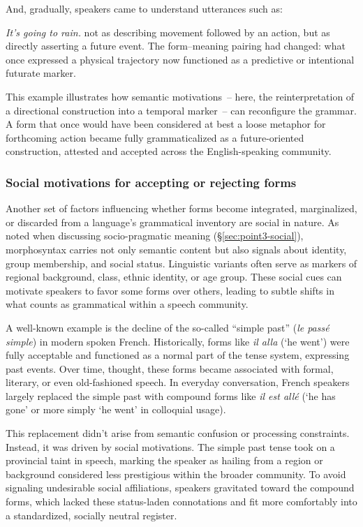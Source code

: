 \ea
    \z
\z
And, gradually, speakers came to understand utterances such as:

\ea
\textit{It's going to rain.}
\z
not as describing movement followed by an action, but as directly asserting a future event. The form--meaning pairing had changed: what once expressed a physical trajectory now functioned as a predictive or intentional futurate marker.

This example illustrates how semantic motivations~-- here, the reinterpretation of a directional construction into a temporal marker~-- can reconfigure the grammar. A form that once would have been considered at best a loose metaphor for forthcoming action became fully grammaticalized as a future-oriented construction, attested and accepted across the English-speaking community.

\subsubsection{Social motivations for accepting or rejecting forms}\label{subsec:social-motivations}

Another set of factors influencing whether forms become integrated, marginalized, or discarded from a language’s grammatical inventory are social in nature. As noted when discussing socio-pragmatic meaning (\S\ref{sec:point3-social}), morphosyntax carries not only semantic content but also signals about identity, group membership, and social status. Linguistic variants often serve as markers of regional background, class, ethnic identity, or age group. These social cues can motivate speakers to favor some forms over others, leading to subtle shifts in what counts as grammatical within a speech community.

A well-known example is the decline of the so-called “simple past” (\textit{le passé simple}) in modern spoken French. Historically, forms like \textit{il alla} (‘he went’) were fully acceptable and functioned as a normal part of the tense system, expressing past events. Over time, thought, these forms became associated with formal, literary, or even old-fashioned speech. In everyday conversation, French speakers largely replaced the simple past with compound forms like \textit{il est allé} (‘he has gone’ or more simply ‘he went’ in colloquial usage).

This replacement didn't arise from semantic confusion or processing constraints. Instead, it was driven by social motivations. The simple past tense took on a provincial taint in speech, marking the speaker as hailing from a region or background considered less prestigious within the broader community. To avoid signaling undesirable social affiliations, speakers gravitated toward the compound forms, which lacked these status-laden connotations and fit more comfortably into a standardized, socially neutral register.


